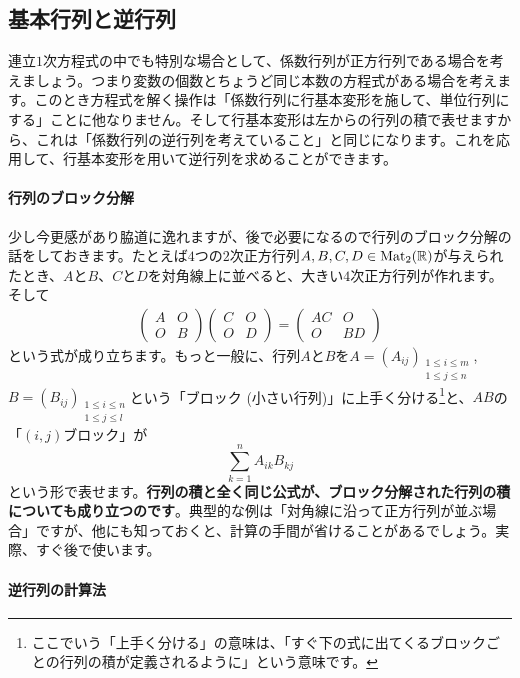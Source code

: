 \subsection{基本行列と逆行列}

連立$1$次方程式の中でも特別な場合として、係数行列が正方行列である場合を考えましょう。つまり変数の個数とちょうど同じ本数の方程式がある場合を考えます。このとき方程式を解く操作は「係数行列に行基本変形を施して、単位行列にする」ことに他なりません。そして行基本変形は左からの行列の積で表せますから、これは「係数行列の逆行列を考えていること」と同じになります。これを応用して、行基本変形を用いて逆行列を求めることができます。

\paragraph{行列のブロック分解}

少し今更感があり脇道に逸れますが、後で必要になるので行列のブロック分解の話をしておきます。たとえば$4$つの$2$次正方行列$A, B, C, D\in\operatorname{Mat}_2(\mathbb{R})$が与えられたとき、$A$と$B$、$C$と$D$を対角線上に並べると、大きい$4$次正方行列が作れます。そして
\begin{align*}
\begin{pmatrix}
A & O \\
O & B 
\end{pmatrix}
\begin{pmatrix}
C & O \\
O & D
\end{pmatrix}
=
\begin{pmatrix}
AC & O \\
O & BD
\end{pmatrix}
\end{align*}
という式が成り立ちます。もっと一般に、行列$A$と$B$を$A = (A_{ij})_{\substack{1\leq i \leq m \\ 1\leq j \leq n}}$, $B = (B_{ij})_{\substack{1\leq i \leq n \\ 1\leq j \leq l}}$という「ブロック (小さい行列)」に上手く分ける\footnote{ここでいう「上手く分ける」の意味は、「すぐ下の式に出てくるブロックごとの行列の積が定義されるように」という意味です。}と、$AB$の「$(i, j)$ブロック」が
\[
\sum_{k = 1}^n A_{ik} B_{kj}
\]
という形で表せます。\textbf{行列の積と全く同じ公式が、ブロック分解された行列の積についても成り立つのです}。典型的な例は「対角線に沿って正方行列が並ぶ場合」ですが、他にも知っておくと、計算の手間が省けることがあるでしょう。実際、すぐ後で使います。

\paragraph{逆行列の計算法}


